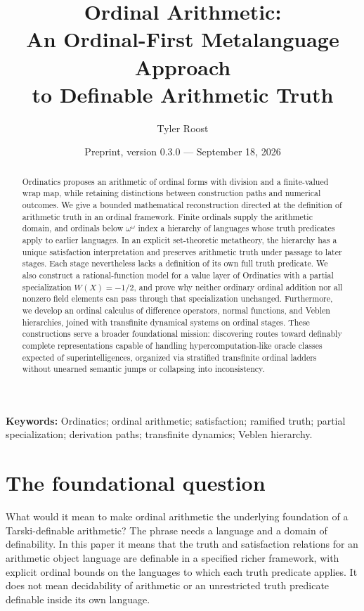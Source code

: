 \documentclass[11pt]{article}
\title{Ordinal Arithmetic:\\An Ordinal-First Metalanguage Approach\\to Definable Arithmetic Truth}
\author{Tyler Roost}
\date{Preprint, version 0.3.0 --- September 18, 2026}
\theoremstyle{definition}
\begin{document}
\maketitle
\begin{abstract}
Ordinatics proposes an arithmetic of ordinal forms with division and a finite-valued wrap map, while retaining distinctions between construction paths and numerical outcomes. We give a bounded mathematical reconstruction directed at the definition of arithmetic truth in an ordinal framework. Finite ordinals supply the arithmetic domain, and ordinals below $\omega^\omega$ index a hierarchy of languages whose truth predicates apply to earlier languages. In an explicit set-theoretic metatheory, the hierarchy has a unique satisfaction interpretation and preserves arithmetic truth under passage to later stages. Each stage nevertheless lacks a definition of its own full truth predicate. We also construct a rational-function model for a value layer of Ordinatics with a partial specialization $W(X)=-1/2$, and prove why neither ordinary ordinal addition nor all nonzero field elements can pass through that specialization unchanged. Furthermore, we develop an ordinal calculus of difference operators, normal functions, and Veblen hierarchies, joined with transfinite dynamical systems on ordinal stages. These constructions serve a broader foundational mission: discovering routes toward definably complete representations capable of handling hypercomputation-like oracle classes expected of superintelligences, organized via stratified transfinite ordinal ladders without unearned semantic jumps or collapsing into inconsistency.
\end{abstract}
\noindent\textbf{Keywords:} Ordinatics; ordinal arithmetic; satisfaction; ramified truth; partial specialization; derivation paths; transfinite dynamics; Veblen hierarchy.

\section{The foundational question}
What would it mean to make ordinal arithmetic the underlying foundation of a Tarski-definable arithmetic? The phrase needs a language and a domain of definability. In this paper it means that the truth and satisfaction relations for an arithmetic object language are definable in a specified richer framework, with explicit ordinal bounds on the languages to which each truth predicate applies. It does not mean decidability of arithmetic or an unrestricted truth predicate definable inside its own language.
\end{document}
